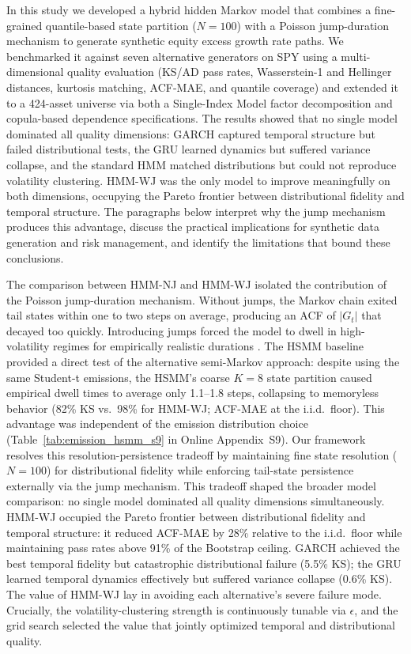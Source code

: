 In this study we developed a hybrid hidden Markov model that combines a fine-grained quantile-based state partition ($N=100$) with a Poisson jump-duration mechanism to generate synthetic equity excess growth rate paths. We benchmarked it against seven alternative generators on SPY using a multi-dimensional quality evaluation (KS/AD pass rates, Wasserstein-1 and Hellinger distances, kurtosis matching, ACF-MAE, and quantile coverage) and extended it to a 424-asset universe via both a Single-Index Model factor decomposition and copula-based dependence specifications. The results showed that no single model dominated all quality dimensions: GARCH captured temporal structure but failed distributional tests, the GRU learned dynamics but suffered variance collapse, and the standard HMM matched distributions but could not reproduce volatility clustering. HMM-WJ was the only model to improve meaningfully on both dimensions, occupying the Pareto frontier between distributional fidelity and temporal structure. The paragraphs below interpret why the jump mechanism produces this advantage, discuss the practical implications for synthetic data generation and risk management, and identify the limitations that bound these conclusions.

The comparison between HMM-NJ and HMM-WJ isolated the contribution of the Poisson jump-duration mechanism. Without jumps, the Markov chain exited tail states within one to two steps on average, producing an ACF of $|G_t|$ that decayed too quickly. Introducing jumps forced the model to dwell in high-volatility regimes for empirically realistic durations \cite{ryden_stylized_1998, bulla_stylized_2006}. The HSMM baseline provided a direct test of the alternative semi-Markov approach: despite using the same Student-t emissions, the HSMM's coarse $K=8$ state partition caused empirical dwell times to average only 1.1--1.8 steps, collapsing to memoryless behavior (82\% KS vs.\ 98\% for HMM-WJ; ACF-MAE at the i.i.d.\ floor). This advantage was independent of the emission distribution choice (Table~\ref{tab:emission_hsmm_s9} in Online Appendix~S9). Our framework resolves this resolution-persistence tradeoff by maintaining fine state resolution ($N=100$) for distributional fidelity while enforcing tail-state persistence externally via the jump mechanism. This tradeoff shaped the broader model comparison: no single model dominated all quality dimensions simultaneously. HMM-WJ occupied the Pareto frontier between distributional fidelity and temporal structure: it reduced ACF-MAE by 28\% relative to the i.i.d.\ floor while maintaining pass rates above 91\% of the Bootstrap ceiling. GARCH achieved the best temporal fidelity but catastrophic distributional failure (5.5\% KS); the GRU learned temporal dynamics effectively but suffered variance collapse (0.6\% KS). The value of HMM-WJ lay in avoiding each alternative's severe failure mode. Crucially, the volatility-clustering strength is continuously tunable via $\epsilon$, and the grid search selected the value that jointly optimized temporal and distributional quality.

